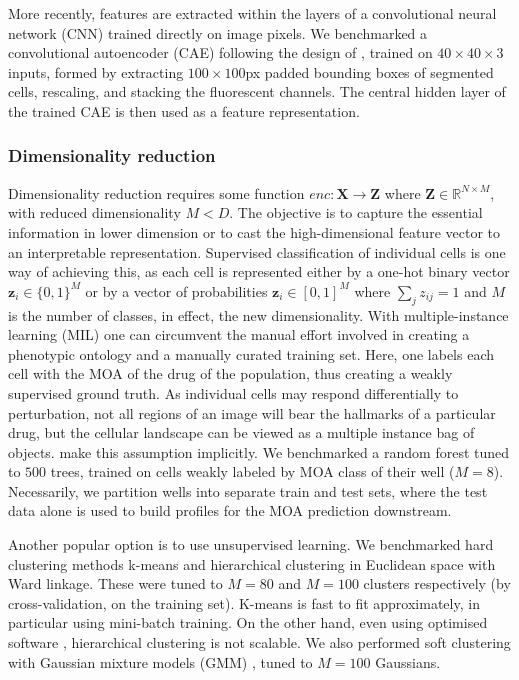 More recently, features are extracted within the layers of a convolutional neural network (CNN) trained directly on image pixels. We benchmarked a convolutional autoencoder (CAE) following the design of \cite{sommer2017deep}, trained on $40 \times 40 \times 3$ inputs, formed by extracting $100 \times 100$px padded bounding boxes of segmented cells, rescaling, and stacking the fluorescent channels. The central hidden layer of the trained CAE is then used as a feature representation.

\subsubsection{Dimensionality reduction}
\label{subsubsec:dimensionality_reduction}

Dimensionality reduction requires some function $enc : \mathbf{X} \to \mathbf{Z}$ where $\mathbf{Z} \in \mathbb{R}^{N\times M}$, with reduced dimensionality $M < D$. 
The objective is to capture the essential information in lower dimension or to cast the high-dimensional feature vector to an interpretable representation.
Supervised classification of individual cells \cite{neumann2010phenotypic} is one way of achieving this, as each cell is represented either by a one-hot binary vector $\mathbf{z}_i \in \{0, 1\}^M$ or by a vector of probabilities $\mathbf{z}_i \in [0, 1]^M$ where $\sum_j z_{ij} = 1$  and $M$ is the number of classes, in effect, the new dimensionality. With multiple-instance learning (MIL) \cite{kraus2016classifying} one can circumvent the manual effort involved in creating a phenotypic ontology and a manually curated training set. Here, one labels each cell with the MOA of the drug of the population, thus creating a weakly supervised ground truth. As individual cells may respond differentially to perturbation, not all regions of an image will bear the hallmarks of a particular drug, but the cellular landscape can be viewed as a multiple instance bag of objects. \cite{godinez2017multi} make this assumption implicitly. We benchmarked a random forest tuned to $500$ trees, trained on cells weakly labeled by MOA class of their well ($M = 8$). Necessarily, we partition wells into separate train and test sets, where the test data alone is used to build profiles for the MOA prediction downstream.

Another popular option is to use unsupervised learning. We benchmarked hard clustering methods k-means and hierarchical clustering in Euclidean space with Ward linkage. These were tuned to $M = 80$ and $M = 100$ clusters respectively (by cross-validation, on the training set). K-means is fast to fit approximately, in particular using mini-batch training. On the other hand, even using optimised software \cite{mullner2013fastcluster}, hierarchical clustering is not scalable. We also performed soft clustering with Gaussian mixture models (GMM) \cite{slack2008characterizing}, tuned to $M = 100$ Gaussians.

